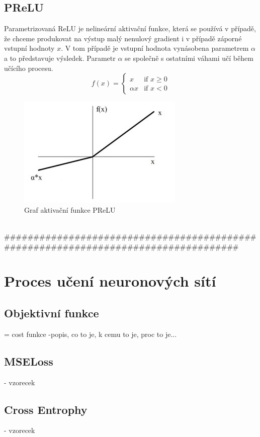 \subsection{PReLU}
Parametrizovaná ReLU je nelineární aktivační funkce, která se používá v případě, že chceme produkovat na výstup malý nenulový gradient i v případě záporné vstupní hodnoty $x$. V tom případě je vstupní hodnota vynásobena parametrem $\alpha$ a to představuje výsledek. Parametr $\alpha$ se společně s ostatními váhami učí během učícího procesu.
\begin{equation}
  f(x) =
  \begin{cases}
    x & \text{if } x \geq 0 \\
    {\alpha}x & \text{if } x < 0
  \end{cases}
\end{equation}
\begin{figure}[H]
    \centering
    \includegraphics[scale=1]{obrazky-figures/prelu.jpg}
    \caption{\label{fig:prelu}Graf aktivační funkce PReLU}
\end{figure}


\\###################################################################################
\section{Proces učení neuronových sítí}

\subsection{Objektivní funkce}
= cost funkce
-popis, co to je, k cemu to je, proc to je...
\subsection*{MSELoss}
- vzorecek
\subsection*{Cross Entrophy}
- vzorecek

